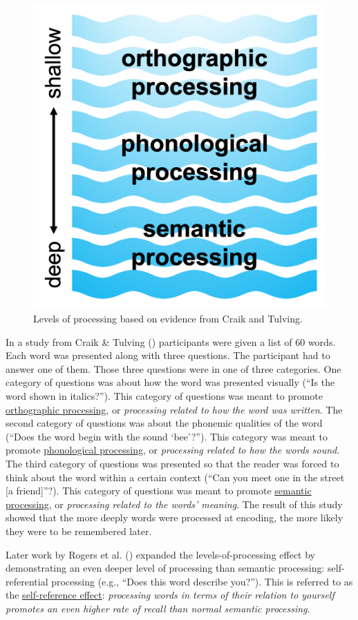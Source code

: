 \documentclass[
]{krantz}
\begin{document}
\begin{figure}

{\centering \includegraphics[width=0.35\linewidth]{images/ch5/fig4} 

}

\caption{Levels of processing based on evidence from Craik and Tulving.}\label{fig:lop}
\end{figure}

In a study from Craik \& Tulving () participants were given a list of 60 words. Each word was presented along with three questions. The participant had to answer one of them. Those three questions were in one of three categories. One category of questions was about how the word was presented visually (``Is the word shown in italics?''). This category of questions was meant to promote \hyperref[orthographic-processing]{orthographic processing}, or \emph{processing related to how the word was written}. The second category of questions was about the phonemic qualities of the word (``Does the word begin with the sound `bee'?''). This category was meant to promote \hyperref[phonological-processing]{phonological processing}, or \emph{processing related to how the words sound}. The third category of questions was presented so that the reader was forced to think about the word within a certain context (``Can you meet one in the street {[}a friend{]}''?). This category of questions was meant to promote \hyperref[semantic-processing]{semantic processing}, or \emph{processing related to the words' meaning}. The result of this study showed that the more deeply words were processed at encoding, the more likely they were to be remembered later.

Later work by Rogers et al. () expanded the levels-of-processing effect by demonstrating an even deeper level of processing than semantic processing: self-referential processing (e.g., ``Does this word describe you?''). This is referred to as the \hyperref[self-reference-effect]{self-reference effect}: \emph{processing words in terms of their relation to yourself promotes an even higher rate of recall than normal semantic processing}.
\end{document}
